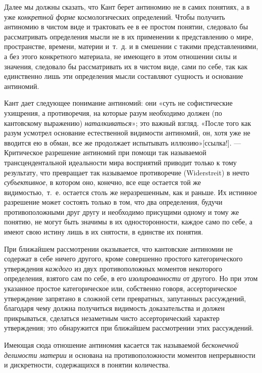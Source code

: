 Далее мы должны сказать, что Кант берет антиномию не в самих понятиях, а в
уже {\em конкретной форме} космологических определений.
Чтобы получить антиномию в чистом виде и трактовать ее в ее простом
понятии, следовало бы рассматривать определения мысли не в их применении к
представлению о мире, пространстве, времени, материи и~т.~д. и в смешении с
такими представлениями, а без этого конкретного материала, не имеющего в
этом отношении силы и значения, следовало бы рассматривать их в чистом
виде, сами по себе, так как единственно лишь эти определения мысли
составляют сущность и основание антиномий.

Кант дает следующее понимание антиномий: они «суть не софистические
ухищрения, а противоречия, на которые разум необходимо должен (по
кантовскому выражению) {\em наталкиваться}»; это важный
взгляд. «После того как разум усмотрел основание естественной видимости
антиномий, он, хотя уже не вводится ею в обман, все же продолжает
испытывать
иллюзию»[ссылка!]. — Критическое разрешение
антиномий при помощи так называемой трансцендентальной идеальности мира
восприятий приводит только к тому результату, что превращает так называемое
противоречие (Widerstreit) в нечто {\em субъективное},
в котором оно, конечно, все еще остается той же видимостью,~т.~е. остается
столь же неразрешенным, как и раньше. Их истинное разрешение может состоять
только в том, что два определения, будучи противоположными друг другу и
необходимо присущими одному и тому же понятию, не могут быть значимы в их
односторонности, каждое само по себе, а имеют свою истину лишь в их
снятости, в единстве их понятия.

При ближайшем рассмотрении оказывается, что кантовские антиномии не содержат
в себе ничего другого, кроме совершенно простого категорического
утверждения {\em каждого} из двух противоположных
моментов некоторого определения, взятого сам по себе, в его
{\em изолированности} от другого. Но при этом указанное
простое категорическое или, собственно говоря, ассерторическое утверждение
запрятано в сложной сети превратных, запутанных рассуждений, благодаря чему
должна получиться видимость доказательства и должен прикрываться, сделаться
незаметным чисто ассерторический характер утверждения; это обнаружится при
ближайшем рассмотрении этих рассуждений.

Имеющая сюда отношение антиномия касается так называемой
{\em бесконечной делимости материи} и основана на
противоположности моментов непрерывности и дискретности, содержащихся в
понятии количества.

